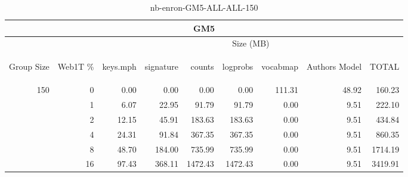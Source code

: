 \begin{center}
\begin{table}[htbp] 
 \begin{center}
\begin{tabular}{ | r | r | r | r | r | r | r | r | r |}
\hline
\multicolumn{9}{|c|}{GM5}\\
\hline
 & & \multicolumn{7}{|c|}{Size (MB)}\\ \cline{3-9}
\begin{sideways}Group Size\end{sideways} & \begin{sideways}Web1T \% \end{sideways} & \begin{sideways}keys.mph\end{sideways} & \begin{sideways}signature\end{sideways} & \begin{sideways}counts\end{sideways} & \begin{sideways}logprobs\end{sideways} & \begin{sideways}vocabmap\end{sideways} & \begin{sideways}Authors Model \end{sideways} & \begin{sideways}TOTAL\end{sideways}\\
\hline
\multirow{5}{*}{150}
 & 0 & 0.00 & 0.00 & 0.00 & 0.00 & 111.31 & 48.92 & 160.23\\ \cline{2-9}
 & 1 & 6.07 & 22.95 & 91.79 & 91.79 & 0.00 & 9.51 & 222.10\\ \cline{2-9}
 & 2 & 12.15 & 45.91 & 183.63 & 183.63 & 0.00 & 9.51 & 434.84\\ \cline{2-9}
 & 4 & 24.31 & 91.84 & 367.35 & 367.35 & 0.00 & 9.51 & 860.35\\ \cline{2-9}
 & 8 & 48.70 & 184.00 & 735.99 & 735.99 & 0.00 & 9.51 & 1714.19\\ \cline{2-9}
 & 16 & 97.43 & 368.11 & 1472.43 & 1472.43 & 0.00 & 9.51 & 3419.91\\ \cline{2-9}
\hline
\end{tabular}
\caption{nb-enron-GM5-ALL-ALL-150}
\label{table:nb-enron-GM5-ALL-ALL-150}
\end{center}
 \end{table}
\end{center}

